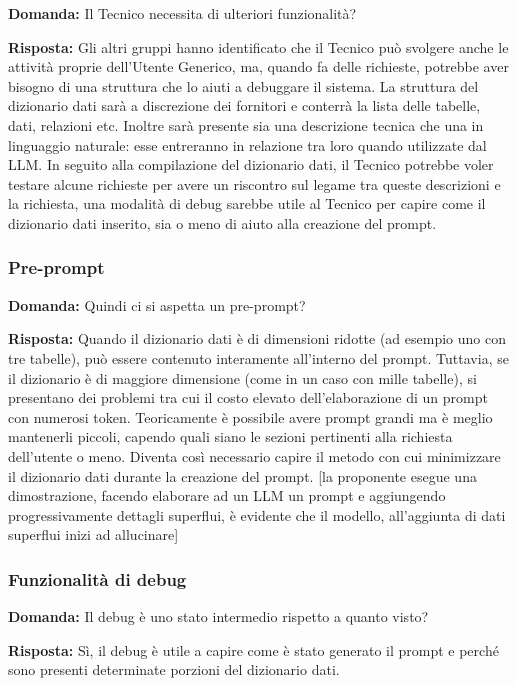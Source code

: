 \textbf{Domanda:} Il Tecnico necessita di ulteriori funzionalità?

\textbf{Risposta:} Gli altri gruppi hanno identificato che il Tecnico può svolgere anche le attività proprie dell’Utente Generico, ma, quando fa delle richieste, potrebbe aver bisogno di una struttura che lo aiuti a debuggare il sistema.
La struttura del dizionario dati sarà a discrezione dei fornitori e conterrà la lista delle tabelle, dati, relazioni etc. Inoltre sarà presente sia una descrizione tecnica che una in linguaggio naturale: esse entreranno in relazione tra loro quando utilizzate dal LLM. In seguito alla compilazione del dizionario dati, il Tecnico potrebbe voler testare alcune richieste per avere un riscontro sul legame tra queste descrizioni e la richiesta, una modalità di debug sarebbe utile al Tecnico per capire come il dizionario dati inserito, sia o meno di aiuto alla creazione del prompt.


\subsubsection{Pre-prompt}

\textbf{Domanda:} Quindi ci si aspetta un pre-prompt?

\textbf{Risposta:} Quando il dizionario dati è di dimensioni ridotte (ad esempio uno con tre tabelle), può essere contenuto interamente all’interno del prompt. Tuttavia, se il dizionario è di maggiore dimensione (come in un caso con mille tabelle), si presentano dei problemi tra cui il costo elevato dell’elaborazione di un prompt con numerosi token. Teoricamente è possibile avere prompt grandi ma è meglio mantenerli piccoli, capendo quali siano le sezioni pertinenti alla richiesta dell’utente o meno. Diventa così necessario capire il metodo con cui minimizzare il dizionario dati durante la creazione del prompt.
[la proponente esegue una dimostrazione, facendo elaborare ad un LLM un prompt e aggiungendo progressivamente dettagli superflui, è evidente che il modello, all’aggiunta di dati superflui inizi ad allucinare]

\subsubsection{Funzionalità di debug}

\textbf{Domanda:} Il debug è uno stato intermedio rispetto a quanto visto?

\textbf{Risposta:} Sì, il debug è utile a capire come è stato generato il prompt e perché sono presenti determinate porzioni del dizionario dati.


